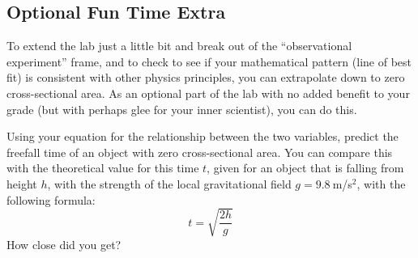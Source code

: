 \subsection{Optional Fun Time Extra}

To extend the lab just a little bit and break out of the ``observational experiment'' frame, and to check to see if your mathematical pattern (line of best fit) is consistent with other physics principles, you can extrapolate down to zero cross-sectional area. As an optional part of the lab with no added benefit to your grade (but with perhaps glee for your inner scientist), you can do this.

Using your equation for the relationship between the two variables, predict the freefall time of an object with zero cross-sectional area. You can compare this with the theoretical value for this time $t$, given for an object that is falling from height $h$, with the strength of the local gravitational field $g = 9.8\:$m/s$^2$, with the following formula:
\begin{equation}
 t = \sqrt{\frac{2 h}{g}}
\end{equation}
How close did you get?

 
 
 
 
